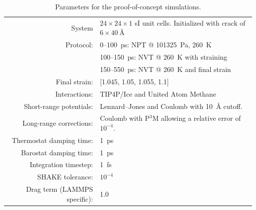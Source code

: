 \begin{table}
\caption{Parameters for the proof-of-concept simulations.}
\label{tbl:proof_of_concept_parameters}
\begin{tabular}{|rl|}
\hline
System & $24\times 24 \times 1$ sI unit cells. Initialized with crack of $6\times \SI{40}{\angstrom}$\\
Protocol:& 0--\SI{100}{\ps}: NPT @ \SI{101325}{\pascal}, \SI{260}{\kelvin} \\
& 100--\SI{150}{\pico\second}: NVT @ \SI{260}{\kelvin} with straining \\
& 150--\SI{550}{\pico\second}: NVT @ \SI{260}{\kelvin} and final strain \\
Final strain: & [1.045, 1.05, 1.055, 1.1] \\
Interactions: & TIP4P/Ice and United Atom Methane \\
Short-range potentials: & Lennard--Jones and Coulomb with \SI{10}{\angstrom} cutoff. \\
Long-range corrections: & Coulomb with P$^3$M allowing a relative error of $10^{-4}$. \\
Thermostat damping time: & \SI{1}{\pico\second} \\
Barostat damping time: & \SI{1}{\pico\second} \\
Integration timestep: & \SI{1}{\femto\second} \\ 
SHAKE tolerance: & $10^{-4}$ \\
Drag term (LAMMPS specific): & 1.0 \\
\hline
\end{tabular} 
\end{table}


